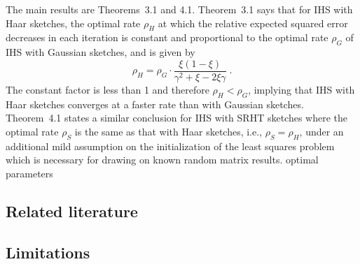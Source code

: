 The main results are Theorems~3.1 and 4.1. Theorem~3.1 says that for IHS with Haar sketches, the optimal rate $\rho_H$ at which the relative expected squared error decreases in each iteration is constant and proportional to the optimal rate $\rho_G$ of IHS with Gaussian sketches, and is given by
\[
\rho_H = \rho_G\cdot\frac{\xi(1-\xi)}{\gamma^2+\xi-2\xi\gamma} \;.
\]
The constant factor is less than 1 and therefore $\rho_H<\rho_G$, implying that IHS with Haar sketches converges at a faster rate than with Gaussian sketches.  Theorem~4.1 states a similar conclusion for IHS with SRHT sketches where the optimal rate $\rho_S$ is the same as that with Haar sketches, i.e., $\rho_S=\rho_H$, under an additional mild assumption on the initialization of the least squares problem which is necessary for drawing on known random matrix results. \todo optimal parameters

\subsection{Related literature}

\subsection{Limitations}